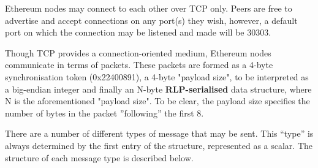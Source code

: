 \documentclass[9pt,oneside]{amsart}
\begin{document}
Ethereum nodes may connect to each other over TCP only. Peers are free to advertise and accept connections on any port(s) they wish, however, a default port on which the connection may be listened and made will be 30303.

Though TCP provides a connection-oriented medium, Ethereum nodes communicate in terms of packets. These packets are formed as a 4-byte synchronisation token (0x22400891), a 4-byte "payload size", to be interpreted as a big-endian integer and finally an N-byte \textbf{RLP-serialised} data structure, where N is the aforementioned "payload size". To be clear, the payload size specifies the number of bytes in the packet ''following'' the first 8.

There are a number of different types of message that may be sent. This ``type'' is always determined by the first entry of the structure, represented as a scalar. The structure of each message type is described below.
\end{document}
